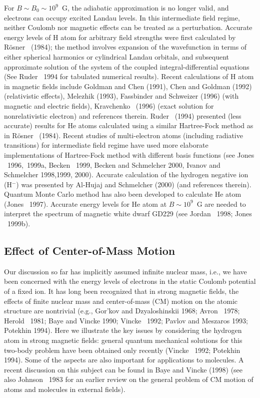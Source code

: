 For $B\sim B_0\sim 10^9$~G, the adiabatic approximation is no longer valid,
and electrons can occupy excited Landau levels. In this intermediate field
regime, neither Coulomb nor magnetic effects can be treated as a perturbation.
Accurate energy levels of H atom for arbitrary field strengths were first
calculated by R\"osner \etal~(1984); the method involves expansion
of the wavefunction in terms of either spherical harmonics or 
cylindrical Landau orbitals, and subsequent approximate solution of the system 
of the coupled integral-differential equations (See Ruder \etal~1994 for
tabulated numerical results). Recent calculations of H atom in 
magnetic fields include Goldman and Chen (1991),
Chen and Goldman (1992) (relativistic 
effects), Melezhik (1993), Fassbinder and Schweizer (1996) (with magnetic
and electric fields), Kravchenko \etal~(1996) (exact solution for
nonrelativistic electron) and references therein. Ruder \etal~(1994) presented
(less accurate) results for He atoms calculated using a similar Hartree-Fock
method as in R\"osner \etal~(1984). Recent studies of multi-electron atoms 
(including radiative transitions) for intermediate field regime have used more
elaborate implementations of Hartree-Fock method with different basis functions
(see Jones \etal~1996,~1999a, Becken \etal~1999,
Becken and Schmelcher 2000, Ivanov and Schmelcher 1998,1999,
2000). Accurate calculation of the hydrogen negative ion (H$^-$) was 
presented by Al-Hujaj and Schmelcher (2000) (and references therein). 
Quantum Monte Carlo method has also been
developed to calculate He atom (Jones \etal~1997).
Accurate energy levels for He atom at $B\sim 10^9$~G are needed to interpret
the spectrum of magnetic white dwarf GD229 (see Jordan \etal~1998;
Jones \etal~1999b).


\subsection{Effect of Center-of-Mass Motion}

Our discussion so far has implicitly assumed infinite nuclear mass,
i.e., we have been concerned with the energy levels of electrons
in the static Coulomb potential of a fixed ion. It has long been
recognized that in strong magnetic fields, the effects of finite nuclear mass
and center-of-mass (CM) motion on the atomic structure are nontrivial
(e.g., Gor'kov and Dzyaloshinskii 1968; Avron \etal~1978; Herold \etal~1981;
Baye and Vincke 1990; Vincke \etal~1992; Pavlov and Meszaros 1993; Potekhin
1994). Here we illustrate 
the key issues by considering the hydrogen atom in strong magnetic fields: 
general quantum mechanical solutions for this two-body problem 
have been obtained only recently (Vincke \etal~1992; Potekhin 1994).
Some of the aspects are also important for applications to molecules.
A recent discussion on this subject can be found in Baye and Vincke (1998) 
(see also Johnson \etal~1983 for an earlier review on the general problem of
CM motion of atoms and molecules in external fields). 

